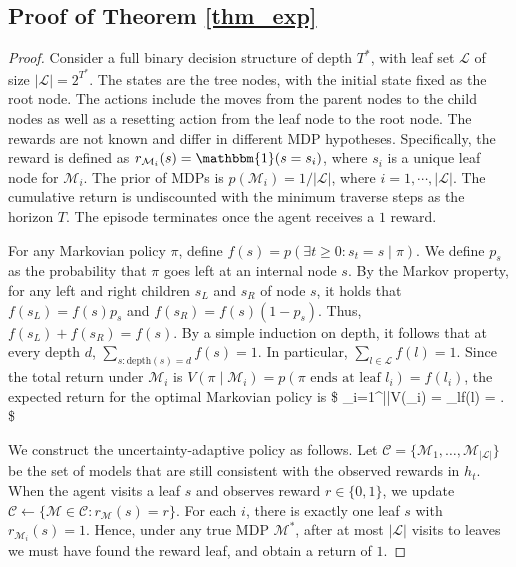 \subsection{Proof of Theorem \ref{thm_exp}}
\begin{proof}
Consider a full binary decision structure of depth $T^*$, with leaf set $\mathcal{L}$ of size $|\mathcal{L}|=2^{T^*}$. The states are the tree nodes, with the initial state fixed as the root node. The actions include the moves from the parent nodes to the child nodes as well as a resetting action from the leaf node to the root node. The rewards are not known and differ in different MDP hypotheses. Specifically, the reward is defined as $r_{\mathcal{M}_i}(s) = \mathbbm{1}(s = s_i)$, where $s_i$ is a unique leaf node for $\mathcal{M}_i$. The prior of MDPs is $p(\mathcal{M}_i)= 1/|\mathcal{L}|$, where $i=1,\cdots, |\mathcal{L}|$. The cumulative return is undiscounted with the minimum traverse steps as the horizon $T$. The episode terminates once the agent receives a $1$ reward.

For any Markovian policy $\pi$, define $f(s) = p(\exists t\geq0:s_t=s\mid \pi)$. We define $p_s$ as the probability that $\pi$ goes left at an internal node $s$. By the Markov property, for any left and right children $s_L$ and $s_R$ of node $s$, it holds that $f(s_L) = f(s) p_s$ and $f(s_R) = f(s) (1-p_s)$. Thus, $f(s_L) + f(s_R) = f(s)$. By a simple induction on depth, it follows that at every depth $d$, $\sum_{s:\text{depth}(s)=d} f(s)= 1$. In particular, $\sum_{l\in\mathcal{L}}f(l) = 1$. Since the total return under $\mathcal{M}_i$ is $V(\pi\mid \mathcal{M}_i) = p(\pi\text{ ends at leaf }l_i) = f(l_i)$, the expected return for the optimal Markovian policy is
\$
\sum_{i=1}^{||}V(\pi\mid {}_i) = \sum_{l\in{}}f(l) = .
\$

We construct the uncertainty-adaptive policy as follows. Let $\mathcal{C}= \{\mathcal{M}_1,\dots,\mathcal{M}_{|\mathcal{L}|}\}$ be the set of models that are still consistent with the observed rewards in $h_t$.
When the agent visits a leaf $s$ and observes reward $r \in \{0,1\}$,
we update $\mathcal{C}\leftarrow\{\mathcal{M} \in \mathcal{C}: r_{\mathcal{M}}(s) = r\}$. For each $i$, there is exactly one leaf $s$ with $r_{\mathcal{M}_i}(s) = 1$. Hence, under any true MDP $\mathcal{M}^*$, after at most $|\mathcal{L}|$ visits to leaves we must have found the reward leaf, and obtain a return of $1$.
\end{proof}

